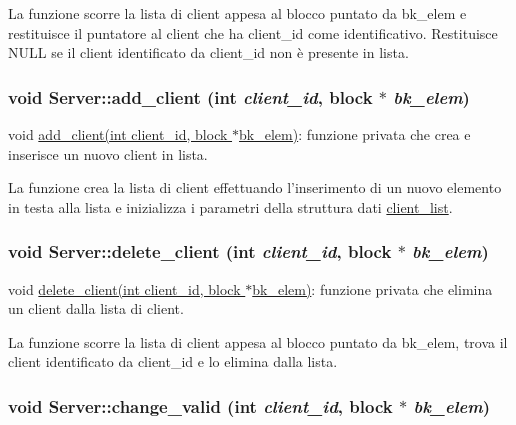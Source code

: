 La funzione scorre la lista di client appesa al blocco puntato da bk\_\-elem e restituisce il puntatore al client che ha client\_\-id come identificativo. Restituisce NULL se il client identificato da client\_\-id non è presente in lista. \hypertarget{classServer_4aa178ff626281eb7a1f0117df69c907_4aa178ff626281eb7a1f0117df69c907}{
\subsubsection[{add\_\-client}]{\setlength{\rightskip}{0pt plus 5cm}void Server::add\_\-client (int {\em client\_\-id}, \/  {\bf block} $\ast$ {\em bk\_\-elem})}}
\label{classServer_4aa178ff626281eb7a1f0117df69c907_4aa178ff626281eb7a1f0117df69c907}


void \hyperlink{classServer_4aa178ff626281eb7a1f0117df69c907_4aa178ff626281eb7a1f0117df69c907}{add\_\-client(int client\_\-id, block $\ast$bk\_\-elem)}: funzione privata che crea e inserisce un nuovo client in lista. 

La funzione crea la lista di client effettuando l'inserimento di un nuovo elemento in testa alla lista e inizializza i parametri della struttura dati \hyperlink{structclient__list}{client\_\-list}. \hypertarget{classServer_5e5b37ba00ab28b4a1d1ed83bbc16e6b_5e5b37ba00ab28b4a1d1ed83bbc16e6b}{
\subsubsection[{delete\_\-client}]{\setlength{\rightskip}{0pt plus 5cm}void Server::delete\_\-client (int {\em client\_\-id}, \/  {\bf block} $\ast$ {\em bk\_\-elem})}}
\label{classServer_5e5b37ba00ab28b4a1d1ed83bbc16e6b_5e5b37ba00ab28b4a1d1ed83bbc16e6b}


void \hyperlink{classServer_5e5b37ba00ab28b4a1d1ed83bbc16e6b_5e5b37ba00ab28b4a1d1ed83bbc16e6b}{delete\_\-client(int client\_\-id, block $\ast$bk\_\-elem)}: funzione privata che elimina un client dalla lista di client. 

La funzione scorre la lista di client appesa al blocco puntato da bk\_\-elem, trova il client identificato da client\_\-id e lo elimina dalla lista. \hypertarget{classServer_e44ebbcc399725c379202cee043a468d_e44ebbcc399725c379202cee043a468d}{
\subsubsection[{change\_\-valid}]{\setlength{\rightskip}{0pt plus 5cm}void Server::change\_\-valid (int {\em client\_\-id}, \/  {\bf block} $\ast$ {\em bk\_\-elem})}}
\label{classServer_e44ebbcc399725c379202cee043a468d_e44ebbcc399725c379202cee043a468d}


